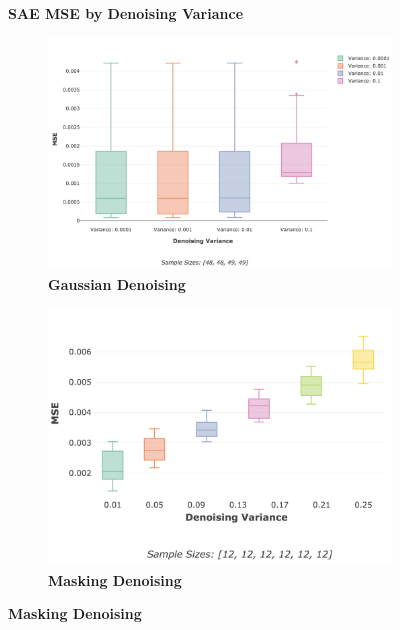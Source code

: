 \documentclass[a4paper,11pt,oneside]{article}
\theoremstyle{plain}
\theoremstyle{definition}
\begin{document}
	\begin{figure}[H]
	\centering
	\textbf{SAE MSE by Denoising Variance}
	\begin{subfigure}{.5\textwidth}
		\centering 
		\includegraphics[scale=0.25]{images/results/network/denoising/actual_mse_gaussian.png}
		\caption{\textbf{Gaussian Denoising} 
			\newline }
		\label{figure-actual_mse_gaussian}
	\end{subfigure}%
	\begin{subfigure}{.5\textwidth}
		\centering 
		\includegraphics[scale=0.25]{images/results/network/denoising/actual_mse_masking.png}
		\caption{\textbf{Masking Denoising} 
			\newline }
		\label{figure-actual_mse_masking}
	\end{subfigure}

\end{figure}
\end{document}
